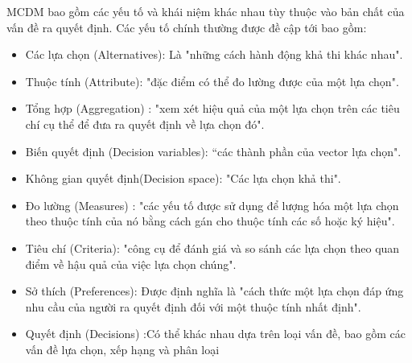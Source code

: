 MCDM bao gồm các yếu tố và khái niệm khác nhau tùy thuộc vào bản chất của vấn đề ra quyết định. Các yếu tố chính thường được đề cập tới bao gồm:
\begin{itemize}
    \item Các lựa chọn (Alternatives): Là "những cách hành động khả thi khác nhau".
    \item Thuộc tính (Attribute): "đặc điểm có thể đo lường được của một lựa chọn".
    \item Tổng hợp (Aggregation) : "xem xét hiệu quả của một lựa chọn trên các tiêu chí cụ thể để đưa ra quyết định về lựa chọn đó".
    \item Biến quyết định (Decision variables): “các thành phần của vector lựa chọn".
\item Không gian quyết định(Decision space): "Các lựa chọn khả thi".
\item Đo lường (Measures) : "các yếu tố được sử dụng để lượng hóa một lựa chọn theo thuộc tính của nó bằng cách gán cho thuộc tính các số hoặc ký hiệu".
\item Tiêu chí (Criteria): "công cụ để đánh giá và so sánh các lựa chọn theo quan điểm về hậu quả của việc lựa chọn chúng".
\item Sở thích (Preferences): Được định nghĩa là "cách thức một lựa chọn đáp ứng nhu cầu của người ra quyết định đối với một thuộc tính nhất định".
\item Quyết định (Decisions) :Có thể khác nhau dựa trên loại vấn đề, bao gồm các vấn đề lựa chọn, xếp hạng và phân loại

\end{itemize}


